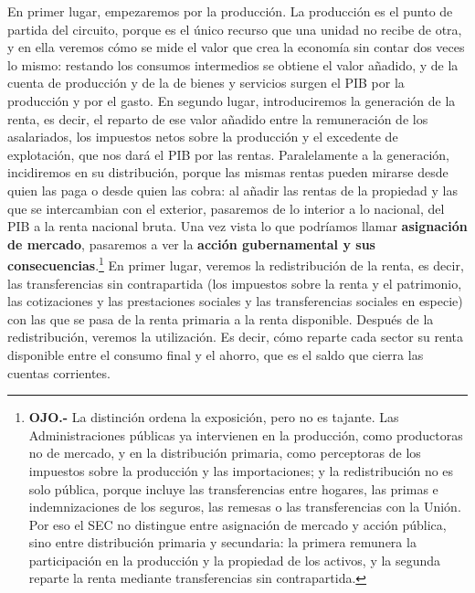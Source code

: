 \documentclass[10pt,a4paper]{article}
\begin{document}
En primer lugar, empezaremos por la producción. La producción es el punto de partida del circuito, porque es el único recurso que una unidad no recibe de otra, y en ella veremos cómo se mide el valor que crea la economía sin contar dos veces lo mismo: restando los consumos intermedios se obtiene el valor añadido, y de la cuenta de producción y de la de bienes y servicios surgen el PIB por la producción y por el gasto. En segundo lugar, introduciremos la generación de la renta, es decir, el reparto de ese valor añadido entre la remuneración de los asalariados, los impuestos netos sobre la producción y el excedente de explotación, que nos dará el PIB por las rentas. Paralelamente a la generación, incidiremos en su distribución, porque las mismas rentas pueden mirarse desde quien las paga o desde quien las cobra: al añadir las rentas de la propiedad y las que se intercambian con el exterior, pasaremos de lo interior a lo nacional, del PIB a la renta nacional bruta. Una vez vista lo que podríamos llamar \textbf{asignación de mercado}, pasaremos a ver la \textbf{acción gubernamental y sus consecuencias}.\footnote{%
    \textbf{OJO.-} La distinción ordena la exposición, pero no es tajante. Las Administraciones públicas ya intervienen en la producción, como productoras no de mercado, y en la distribución primaria, como perceptoras de los impuestos sobre la producción y las importaciones; y la redistribución no es solo pública, porque incluye las transferencias entre hogares, las primas e indemnizaciones de los seguros, las remesas o las transferencias con la Unión. Por eso el SEC no distingue entre asignación de mercado y acción pública, sino entre distribución primaria y secundaria: la primera remunera la participación en la producción y la propiedad de los activos, y la segunda reparte la renta mediante transferencias sin contrapartida.
} En primer lugar, veremos la redistribución de la renta, es decir, las transferencias sin contrapartida (los impuestos sobre la renta y el patrimonio, las cotizaciones y las prestaciones sociales y las transferencias sociales en especie) con las que se pasa de la renta primaria a la renta disponible. Después de la redistribución, veremos la utilización. Es decir, cómo reparte cada sector su renta disponible entre el consumo final y el ahorro, que es el saldo que cierra las cuentas corrientes.
\end{document}
